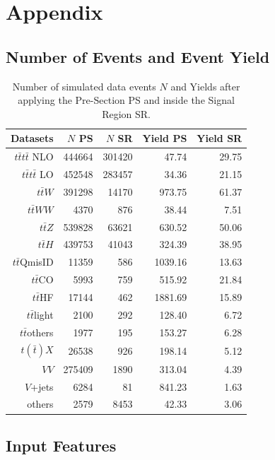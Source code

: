 \chapter{Appendix}
\label{sec:app}

\section*{Number of Events and Event Yield}

\begin{table}[H]
\centering
\begin{tabular}{|r|r|r|r|r|}
\toprule
Datasets & $N$ PS & $N$ SR & Yield PS & Yield SR \\
\midrule
\midrule
$t\bar{t}t\bar{t}$ NLO & 444664 & 301420 & 47.74 & 29.75 \\
$t\bar{t}t\bar{t}$ LO & 452548 & 283457 & 34.36 & 21.15 \\
$t\bar{t}W$ & 391298 & 14170 & 973.75 & 61.37 \\
$t\bar{t}WW$ & 4370 & 876 & 38.44 & 7.51 \\
$t\bar{t}Z$ & 539828 & 63621 & 630.52 & 50.06 \\
$t\bar{t}H$ & 439753 & 41043 & 324.39 & 38.95 \\
$t\bar{t}$QmisID & 11359 & 586 & 1039.16 & 13.63 \\
$t\bar{t}$CO & 5993 & 759 & 515.92 & 21.84 \\
$t\bar{t}$HF & 17144 & 462 & 1881.69 & 15.89 \\
$t\bar{t}$light & 2100 & 292 & 128.40 & 6.72 \\
$t\bar{t}$others & 1977 & 195 & 153.27 & 6.28 \\
$t(\bar{t})X$ & 26538 & 926 & 198.14 & 5.12 \\
$VV$ & 275409 & 1890 & 313.04 & 4.39 \\
$V$+jets & 6284 & 81 & 841.23 & 1.63 \\
others & 2579 & 8453 & 42.33 & 3.06 \\
\bottomrule
\end{tabular}
\caption{Number of simulated data events $N$ and Yields after applying the Pre-Section PS and inside the Signal Region SR.}
\label{tab:prevssr}
\end{table}

\section*{Input Features}
\label{ap:Input}

